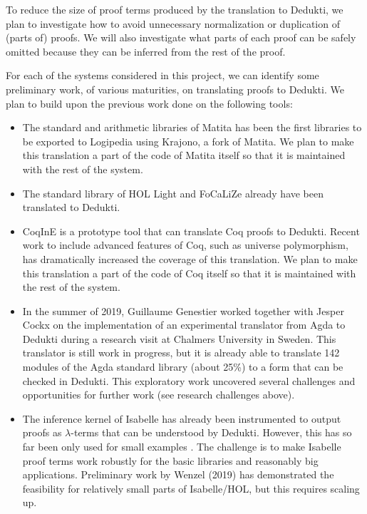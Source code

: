 To reduce the size of proof terms produced by the translation to
Dedukti, we plan to investigate how to avoid unnecessary
normalization or duplication of (parts of) proofs. We will also
investigate what parts of each proof can be safely omitted because
they can be inferred from the rest of the proof.

\bigskip  

For each of the systems considered in this project, we can identify
some preliminary work, of various maturities, on translating proofs to
Dedukti.  We plan to build upon the previous work done on the
following tools:
\begin{itemize}
\item The standard and arithmetic libraries of Matita has been the
  first libraries to be exported to Logipedia using Krajono, a fork of
  Matita. We plan to make this translation a part of the code of
  Matita itself so that it is maintained with the rest of the system.

\item The standard library of HOL Light and FoCaLiZe already have been
  translated to Dedukti.

\item CoqInE is a prototype tool that can translate Coq proofs to
  Dedukti. Recent work to include advanced features of Coq, such as
  universe polymorphism, has dramatically increased the coverage of
  this translation. We plan to make this translation a part of the
  code of Coq itself so that it is maintained with the rest of the
  system.

\item In the summer of 2019, Guillaume Genestier worked together with
  Jesper Cockx on the implementation of an experimental translator
  from Agda to Dedukti during a research visit at Chalmers University
  in Sweden. This translator is still work in progress, but it is
  already able to translate 142 modules of the Agda standard library
  (about 25\%) to a form that can be checked in Dedukti. This
  exploratory work uncovered several challenges and opportunities for
  further work (see research challenges above).

\item The inference kernel of Isabelle has already been instrumented
  to output proofs as $\lambda$-terms that can be understood by
  Dedukti. However, this has so far been only used for small examples
  \cite{Berghofer-Nipkow:2000:TPHOL}. The challenge is to make
  Isabelle proof terms work robustly for the basic libraries and
  reasonably big applications.  Preliminary work by Wenzel (2019) has
  demonstrated the feasibility for relatively small parts of
  Isabelle/HOL, but this requires scaling up.


\end{itemize}
